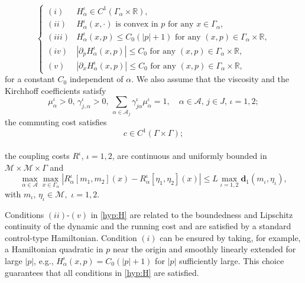 \documentclass[smallextended,referee,envcountsect,]{svjour3}
\newcommand{\R}{{\mathbb{R}}}
\newcommand{\Wass}{\mathbf{d}}
\newcommand{\G}{\Gamma}
\newcommand{\cA}{{\mathcal A}}
\newcommand{\cM}{{\mathcal M}}
\renewcommand{\a}{{\alpha}}
\newcommand{\g}{{\gamma}}
\begin{document}
\begin{equation}\label{hyp:H}
	\begin{cases}
			  (i) &\text{$H_\a^\iota\in C^1(\Gamma_{\a}\times\R)$},\\
 			 (ii) &\text{$H_\a^\iota(x, \cdot)$ is convex in $p$ for any $x\in\Gamma_{\a}$},\\
 			 (iii)& \text{$H_\a^\iota(x, p)\leq C_0(|p|+1)$ for any $(x, p)\in\Gamma_{\a}\times\R$},\\ 
 			  (iv)&  \text{$|\partial_pH_\a^\iota(x, p)|\leq C_0$ for any $(x, p)\in\Gamma_{\a}\times\R$,}\\
 			 (v)  & \text{$|\partial_xH_\a^\iota(x, p)|\leq C_0$ for any $(x, p)\in\Gamma_{\a}\times\R$,}
	\end{cases}
\end{equation}
for a constant $C_0$ independent of $\a$. We also assume that the viscosity and the Kirchhoff coefficients satisfy 
\begin{equation*} 
	\mu^\iota_\a>0,  \,\g^\iota_{j,\a}>0, \, \sum_{\alpha\in\cA_{j}}\gamma^\iota_{j\alpha}\mu^\iota_{\alpha}=1, \quad  \a\in \cA,\,j\in J,\, \iota=1,2;
\end{equation*}
 the commuting cost satisfies
\begin{equation}\label{comm_cost}
c\in C^1(\G\times \G);
\end{equation}\\
the coupling  costs $R^\iota$, $\iota=1,2$, are continuous and uniformly  bounded in $\cM\times\cM\times\G$ and
\begin{equation}\label{ip_coupling} 
\max_{\a\in\cA}\max_{x\in\G_\a}\left|R^\iota_\a[m_1, m_2](x)-R^\iota_\a[\eta_1,\eta_2](x)\right|\le L\max_{\iota=1,2}\Wass_1(m_\iota,\eta_\iota),
\end{equation}  
with $m_\iota,\,\eta_\iota\in \cM,$ $\iota=1,2$.

\begin{remark}
Conditions $(ii)$-$(v)$ in \eqref{hyp:H}  are related to the boundedness and
Lipschitz continuity of the dynamic and the running cost and   are satisfied by a standard control-type Hamiltonian. Condition $(i)$ can be ensured by taking, for example, a Hamiltonian quadratic in \(p\) near the origin and smoothly linearly extended for large $|p|$, e.g., $H_\alpha^\iota(x,p) = C_0(|p|+1)$ for $|p|$ sufficiently large. This choice guarantees that all conditions in \eqref{hyp:H} are satisfied.
\end{remark}
\end{document}
